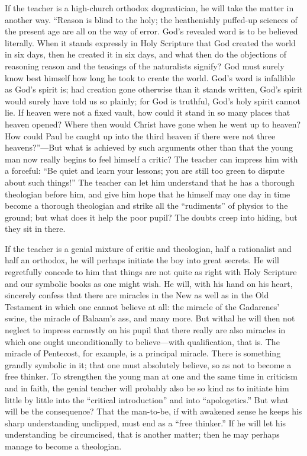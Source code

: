 \documentclass[12pt,a4paper,openany]{book}
\newcommand{\opage}[1]{\marginnote{\footnotesize\textit{[#1]}}}
\begin{document}
If the teacher is a high-church orthodox dogmatician, he will take the
matter in another way. ``Reason is blind to the holy; the heathenishly
puffed-up sciences of the present age are all on the way of error. God's
revealed word is to be believed literally. When it stands expressly in
Holy Scripture that God created the world in six days, then he created it
in six days, and what then do the objections of reasoning reason and the
teasings of the naturalists signify? God must surely know best himself
how long he took to create the world. God's word is infallible as God's
spirit is; had creation gone otherwise than it stands written, \opage{45}God's
spirit would surely have told us so plainly; for God is truthful, God's
holy spirit cannot lie. If heaven were not a fixed vault, how could it
stand in so many places that heaven opened? Where then would Christ have
gone when he went up to heaven? How could Paul be caught up into the
third heaven if there were not three heavens?''---But what is achieved by
such arguments other than that the young man now really begins to feel
himself a critic? The teacher can impress him with a forceful: ``Be quiet
and learn your lessons; you are still too green to dispute about such
things!'' The teacher can let him understand that he has a thorough
theologian before him, and give him hope that he himself may one day in
time become a thorough theologian and strike all the ``rudiments'' of
physics to the ground; but what does it help the poor pupil? The doubts
creep into hiding, but they sit in there.

If the teacher is a genial mixture of critic and theologian, half a
rationalist and half an orthodox, he will perhaps initiate the boy into
great secrets. He will regretfully concede to him that things are not
quite as right with Holy Scripture and our symbolic books as one might
wish. He will, with his hand on his heart, sincerely confess that there
are miracles in the New as well as in the Old Testament in which one
cannot believe at all: the miracle of the Gadarenes' swine, the miracle
of Balaam's ass, and many more. But withal he will then not neglect to
impress earnestly on his pupil that there really are also miracles in
which one ought unconditionally to believe---with qualification, that is.
The miracle of Pentecost, for example, is a \opage{46}principal miracle. There is
something grandly symbolic in it; that one must absolutely believe, so as
not to become a free thinker. To strengthen the young man at one and the
same time in criticism and in faith, the genial teacher will probably
also be so kind as to initiate him little by little into the ``critical
introduction'' and into ``apologetics.'' But what will be the
consequence? %
That the man-to-be, if with awakened sense he keeps his sharp
understanding unclipped, must end as a ``free thinker.'' If he will let
his understanding be circumcised, that is another matter; then he may
perhaps manage to become a theologian.
\end{document}
